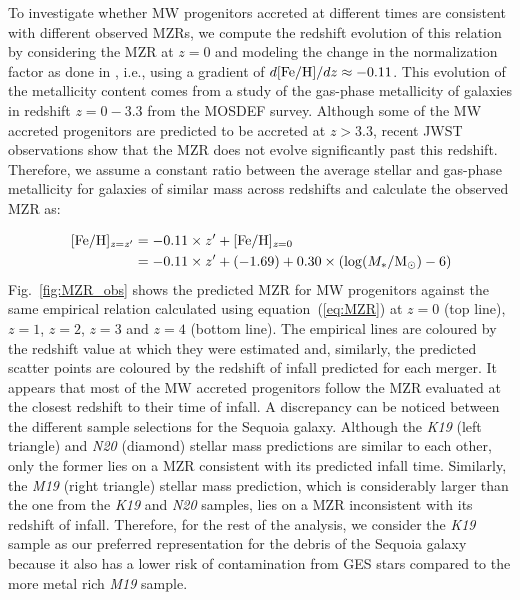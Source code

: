 To investigate whether MW progenitors accreted at different times are consistent with different observed MZRs, we compute the redshift evolution of this relation by considering the MZR at $z=0$ \citep{Kirby2013} and modeling the change in the normalization factor as done in \citet{Sanders2021}, i.e., using a gradient of $d[{\rm{Fe}/{H}}]/dz\approx-0.11$. This evolution of the metallicity content comes from a study of the gas-phase metallicity of galaxies in redshift $z=0-3.3$ from the MOSDEF survey. Although some of the MW accreted progenitors are predicted to be accreted at $z>3.3$, recent JWST observations \citep{Nakajima2023,Sarkar2025} show that the MZR does not evolve significantly past this redshift. Therefore, we assume a constant ratio between the average stellar and gas-phase metallicity for galaxies of similar mass across redshifts and calculate the observed MZR as:

\begin{equation}
    \begin{aligned}
       \,[\rm{Fe/H}]_{\it z=z'} &  = -0.11\times z' + [\rm{Fe/H}]_{{\it z}=0} \\
        & =-0.11\times z' + (-1.69) + 0.30 \times \left( \log(M_{*}/\rm{M_{\odot}})-6 \right)
    \end{aligned}
    \label{eq:MZR}
\end{equation}
Fig.~\ref{fig:MZR_obs} shows the predicted MZR for MW progenitors against the same empirical relation calculated using equation~(\ref{eq:MZR}) at $z=0$ (top line), $z=1$, $z=2$, $z=3$ and $z=4$ (bottom line). The empirical lines are coloured by the redshift value at which they were estimated and, similarly, the predicted scatter points are coloured by the redshift of infall predicted for each merger. It appears that most of the MW accreted progenitors follow the MZR evaluated at the closest redshift to their time of infall. A discrepancy can be noticed between the different sample selections for the Sequoia galaxy. Although the \textit{K19} (left triangle) and \textit{N20} (diamond) stellar mass predictions are similar to each other, only the former lies on a MZR consistent with its predicted infall time. Similarly, the \textit{M19} (right triangle) stellar mass prediction, which is considerably larger than the one from the \textit{K19} and \textit{N20} samples, lies on a MZR inconsistent with its redshift of infall. Therefore, for the rest of the analysis, we consider the \textit{K19} sample as our preferred representation for the debris of the Sequoia galaxy because it also has a lower risk of contamination from GES stars compared to the more metal rich \textit{M19} sample.  

